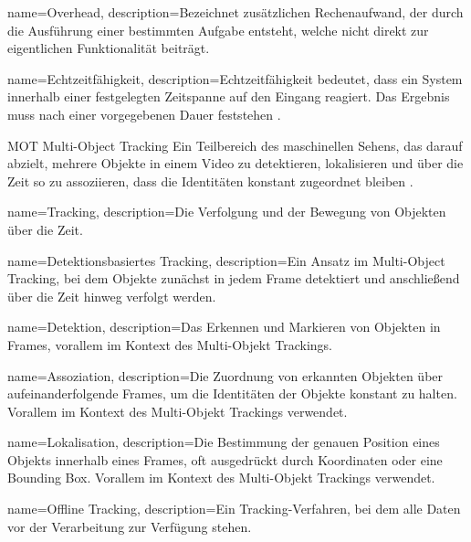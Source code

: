 {
        name=Overhead,
        description={Bezeichnet zusätzlichen Rechenaufwand, der durch die Ausführung einer bestimmten Aufgabe entsteht, welche nicht direkt zur eigentlichen Funktionalität beiträgt.}
}


{
        name=Echtzeitfähigkeit,
        description={Echtzeitfähigkeit bedeutet, dass ein System innerhalb einer festgelegten Zeitspanne auf den Eingang reagiert. Das Ergebnis muss nach einer vorgegebenen Dauer feststehen \cite{Scholz.2005}.}
}


\newglossaryentrywithacronym
{MOT}
{Multi-Object Tracking}
{Ein Teilbereich des maschinellen Sehens, das darauf abzielt, mehrere Objekte in einem Video zu detektieren, lokalisieren und über die Zeit so zu assoziieren, dass die Identitäten konstant zugeordnet bleiben \cite{HOTA}.}

{
name=Tracking,
description={Die Verfolgung und der Bewegung von Objekten über die Zeit.}
}

{
name=Detektionsbasiertes Tracking,
description={Ein Ansatz im Multi-Object Tracking, bei dem Objekte zunächst in jedem Frame detektiert und anschließend über die Zeit hinweg verfolgt werden.}
}

{
name=Detektion,
description={Das Erkennen und Markieren von Objekten in Frames, vorallem im Kontext des Multi-Objekt Trackings.}
}

{
name=Assoziation,
description={Die Zuordnung von erkannten Objekten über aufeinanderfolgende Frames, um die  Identitäten der Objekte konstant zu halten. Vorallem im Kontext des Multi-Objekt Trackings verwendet.}
}

{
name=Lokalisation,
description={Die Bestimmung der genauen Position eines Objekts innerhalb eines Frames, oft ausgedrückt durch Koordinaten oder eine Bounding Box. Vorallem im Kontext des Multi-Objekt Trackings verwendet.}
}

{
name=Offline Tracking,
description={Ein Tracking-Verfahren, bei dem alle Daten vor der Verarbeitung zur Verfügung stehen.}
}

